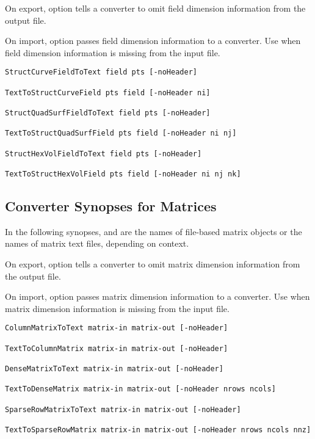 On export, option  tells a converter to omit
field dimension information from the output file.

On import, option  passes field dimension
information to a converter. Use  when field
dimension information is missing from the input file.

\begin{verbatim}
StructCurveFieldToText field pts [-noHeader]

TextToStructCurveField pts field [-noHeader ni]

StructQuadSurfFieldToText field pts [-noHeader]

TextToStructQuadSurfField pts field [-noHeader ni nj]

StructHexVolFieldToText field pts [-noHeader]

TextToStructHexVolField pts field [-noHeader ni nj nk]

\end{verbatim}

\subsection{Converter Synopses for Matrices}

In the following synopses,  and 
are the names of \sr{} file-based matrix objects or the names
of matrix text files, depending on context.

On export, option  tells a converter to omit matrix
dimension information from the output file.

On import, option  passes matrix dimension
information to a converter.  Use  when matrix
dimension information is missing from the input file.

\begin{verbatim}
ColumnMatrixToText matrix-in matrix-out [-noHeader]

TextToColumnMatrix matrix-in matrix-out [-noHeader]

DenseMatrixToText matrix-in matrix-out [-noHeader]

TextToDenseMatrix matrix-in matrix-out [-noHeader nrows ncols]

SparseRowMatrixToText matrix-in matrix-out [-noHeader]

TextToSparseRowMatrix matrix-in matrix-out [-noHeader nrows ncols nnz]
\end{verbatim}

